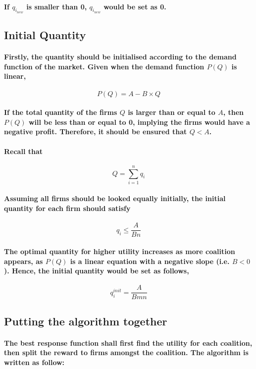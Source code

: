 \documentclass[11pt]{report}
\begin{document}
\paragraph{If $q_{i_{new}}$ is smaller than 0, $q_{i_{new}}$ would be set as 0.}

\subsection{Initial Quantity}
\paragraph{Firstly, the quantity should be initialised according to the demand function of the market. Given when the demand function $P(Q)$ is linear,}
\[P(Q) = A -B\times Q\]
\paragraph{If the total quantity  of the firms $Q$ is larger than or equal to $A$, then $P(Q)$ will be less than or equal to 0, implying the firms would have a negative profit. Therefore, it should be ensured that $Q<A$.}
\paragraph{Recall that}
\[Q=\sum_{i=1}^nq_i\]
\paragraph{Assuming all firms should be looked equally initially, the initial quantity for each firm should satisfy}
\[q_i\leq\frac{A}{Bn}\]
\paragraph{The optimal quantity for higher utility increases as more coalition appears, as $P(Q)$ is a linear equation with a negative slope (i.e. $B < 0$). Hence, the initial quantity would be set as follows, }
\[q_i^{init}=\frac{A}{Bmn}\]
\newpage 
\subsection{Putting the algorithm together}

\paragraph{The best response function shall first find the utility for each coalition, then split the reward to firms amongst the coalition. The algorithm is written as follow: }
\end{document}
